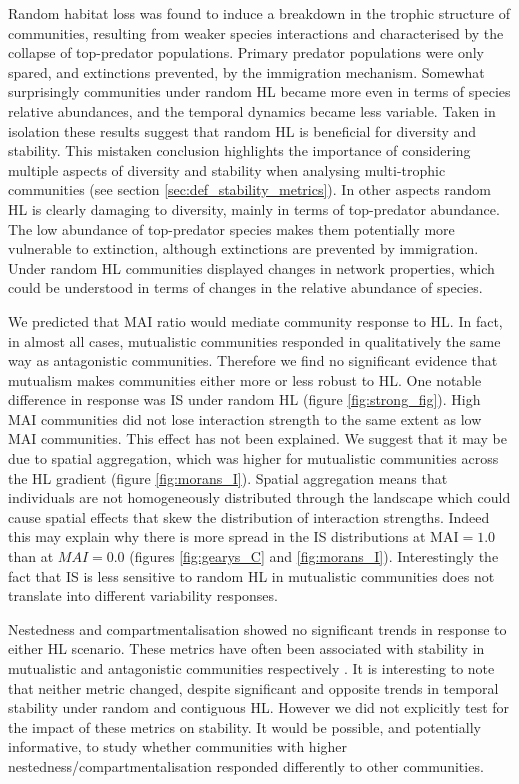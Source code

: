 Random habitat loss was found to induce a breakdown in the trophic structure of communities, resulting from weaker species interactions and characterised by the collapse of top-predator populations. Primary predator populations were only spared, and extinctions prevented, by the immigration mechanism. Somewhat surprisingly communities under random HL became more even in terms of species relative abundances, and the temporal dynamics became less variable. Taken in isolation these results suggest that random HL is beneficial for diversity and stability. This mistaken conclusion highlights the importance of considering multiple aspects of diversity and stability when analysing multi-trophic communities (see section \ref{sec:def_stability_metrics}). In other aspects random HL is clearly damaging to diversity, mainly in terms of top-predator abundance. The low abundance of top-predator species makes them potentially more vulnerable to extinction, although extinctions are prevented by immigration. Under random HL communities displayed changes in network properties, which could be understood in terms of changes in the relative abundance of species.

We predicted that MAI ratio would mediate community response to HL. In fact, in almost all cases, mutualistic communities responded in qualitatively the same way as antagonistic communities. Therefore we find no significant evidence that mutualism makes communities either more or less robust to HL. One notable difference in response was IS under random HL (figure \ref{fig:strong_fig}). High MAI communities did not lose interaction strength to the same extent as low MAI communities. This effect has not been explained. We suggest that it may be due to spatial aggregation, which was higher for mutualistic communities across the HL gradient (figure \ref{fig:morans_I}). Spatial aggregation means that individuals are not homogeneously distributed through the landscape which could cause spatial effects that skew the distribution of interaction strengths. Indeed this may explain why there is more spread in the IS distributions at MAI$=1.0$ than at $MAI=0.0$ (figures \ref{fig:gearys_C} and \ref{fig:morans_I}). Interestingly the fact that IS is less sensitive to random HL in mutualistic communities does not translate into different variability responses.

Nestedness and compartmentalisation showed no significant trends in response to either HL scenario. These metrics have often been associated with stability in mutualistic and antagonistic communities respectively \cite{thebault2010stability}. It is interesting to note that neither metric changed, despite significant and opposite trends in temporal stability under random and contiguous HL. However we did not explicitly test for the impact of these metrics on stability. It would be possible, and potentially informative, to study whether communities with higher nestedness/compartmentalisation responded differently to other communities.   

